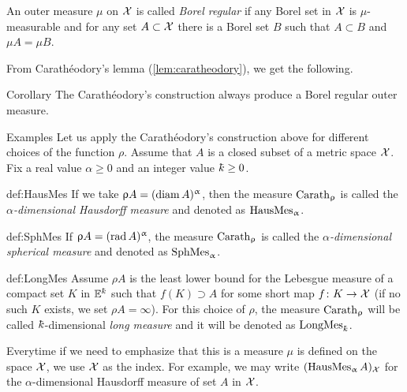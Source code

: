 An outer measure $\mu$ on $\mathcal{X}$ is called \emph{Borel regular} if any Borel set in $\mathcal{X}$ is $\mu$-measurable and for any set $A\subset \spc{X}$ there is a Borel set $B$ such that $A\subset B$ and $\mu A=\mu B$. 

From Carath\'eodory's lemma (\ref{lem:caratheodory}), we get the following.

\begin{thm}{Corollary}
The Carath\'eodory's construction always produce a Borel regular outer measure.
\end{thm}

\begin{thm}{Examples}
Let us apply  the Carath\'eodory's construction above for different choices of the function $\rho$.
Assume that $A$ is a closed subset of a metric space $\mathcal{X}$.
Fix a real value $\alpha\ge 0$ and an integer value $\kay\ge0$. 

\begin{subthm}{def:HausMes}
If we take $\upvarrho A=(\mathop{\rm diam}\nolimits A)^\upalpha$,
then the measure $\mathop{\rm Carath}\nolimits_\upvarrho$ is called the \emph{$\alpha$-dimensional Hausdorff measure} and denoted as $\mathop{\rm HausMes}\nolimits_\upalpha$.
\end{subthm}

\begin{subthm}{def:SphMes}
If $\upvarrho A=(\mathop{\rm rad}\nolimits A)^\upalpha$, the measure $\mathop{\rm Carath}\nolimits_\upvarrho$ is called the \emph{$\alpha$-dimensional spherical measure} and denoted as 
$\mathop{\rm SphMes}\nolimits_\upalpha$.
\end{subthm}


\begin{subthm}{def:LongMes}
Assume $\rho A$ is the least lower bound for the Lebesgue measure of a compact set $K$ in $\EE^\kay$ 
such that $f(K)\supset A$ for some short map $f\:K\to \spc{X}$
(if no such $K$ exists, 
we set $\rho A=\infty$).
For this choice of $\rho$,
the measure $\mathop{\rm Carath}\nolimits_\upvarrho$ will be called $\kay$-dimensional 
\emph{long measure} 
and it will be denoted as $\LongMes_\kay$.
\end{subthm}

Everytime if we need to emphasize that this is a measure $\mu$ is defined on the space $\mathcal{X}$, we use $\mathcal{X}$ as the index.
For example, we may write $(\mathop{\rm HausMes}\nolimits_\upalpha A)_{\mathcal{X}}$ for the $\alpha$-dimensional Hausdorff measure of set $A$ in $\mathcal{X}$.
\end{thm}

